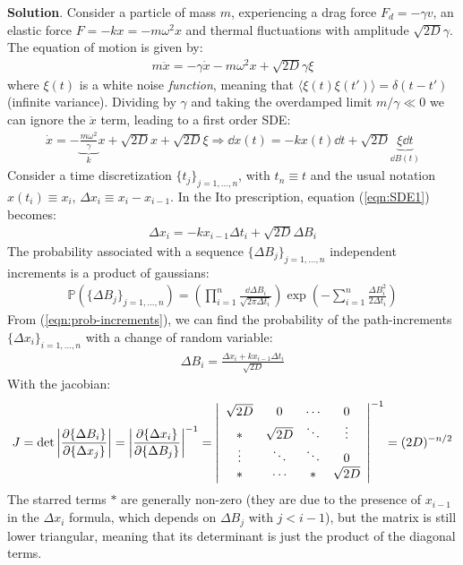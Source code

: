 \documentclass[../template.tex]{subfiles}
\begin{document}
\begin{exo}
    \textbf{Solution}. Consider a particle of mass $m$, experiencing a drag force $F_d = -\gamma v$, an elastic force $F=-kx = -m \omega^2 x$ and thermal fluctuations with amplitude $\sqrt{2 D} \gamma$. The equation of motion is given by:
    \begin{align*}
        m \ddot{x} = - \gamma \dot{x} - m \omega^2 x + \sqrt{2D} \gamma \xi
    \end{align*}
    where $\xi(t)$ is a white noise \textit{function}, meaning that $\langle \xi(t) \xi(t') \rangle = \delta(t-t')$ (infinite variance). Dividing by $\gamma$ and taking the overdamped limit $m/\gamma \ll 0$ we can ignore the $\ddot{x}$ term, leading to a first order SDE:
    \begin{align}
        \dot{x} = -\underbrace{\frac{m \omega^2}{\gamma}}_{k}x + \sqrt{2D} x+ \sqrt{2D} \xi \Rightarrow \dd{x(t)} = - kx(t)\dd{t} + \sqrt{2D} \underbrace{\xi \dd{t}}_{\dd{B(t)}}  \label{eqn:SDE1}
    \end{align}
    Consider a time discretization $\{t_j\}_{j=1,\dots,n}$, with $t_n \equiv t$ and the usual notation $x(t_i) \equiv x_i$, $\Delta x_i \equiv x_i - x_{i-1}$. In the Ito prescription, equation (\ref{eqn:SDE1}) becomes:
    \begin{align*}
        \Delta x_i = - kx_{i-1} \Delta t_i + \sqrt{2D} \Delta B_i
    \end{align*}
    The probability associated with a sequence $\{\Delta B_j\}_{j=1,\dots,n}$ independent increments is a product of gaussians:
    \begin{align} \label{eqn:prob-increments}
        \mathbb{P}(\{\Delta B_j\}_{j=1,\dots,n}) = \left( \prod_{i=1}^n \frac{\dd{\Delta B_i}}{\sqrt{2 \pi \Delta t_i}} \right) \exp\left(-\sum_{i=1}^n \frac{\Delta B_i^2}{2 \Delta t_i} \right) 
    \end{align}
    From (\ref{eqn:prob-increments}), we can find the probability of the path-increments $\{ \Delta x_i\}_{i=1,\dots,n}$ with a change of random variable:
    \begin{align*}
        \Delta B_i = \frac{\Delta x_i + k x_{i-1} \Delta t_i}{\sqrt{2D}}
    \end{align*}
    With the jacobian:
    \begin{align*}
        J = \operatorname{det} \left|\pdv{\{\Delta B_i\}}{\{\Delta x_j\}} \right| = \left|\pdv{\{\Delta x_i\}}{\{\Delta B_j\}} \right|^{-1} = \left|\begin{array}{cccc}
        \sqrt{2D} & 0 & \cdots & 0 \\ 
        * & \sqrt{2D} & \ddots & \vdots \\ 
        \vdots & \ddots & \ddots & 0 \\ 
        * & \cdots & * & \sqrt{2D}
        \end{array}\right|^{-1} = (2D)^{-n/2}
    \end{align*}
    The starred terms $*$ are generally non-zero (they are due to the presence of $x_{i-1}$ in the $\Delta x_i$ formula, which depends on $\Delta B_j$ with $j < i-1$), but the matrix is still lower triangular, meaning that its determinant is just the product of the diagonal terms.


\end{exo}
\end{document}
